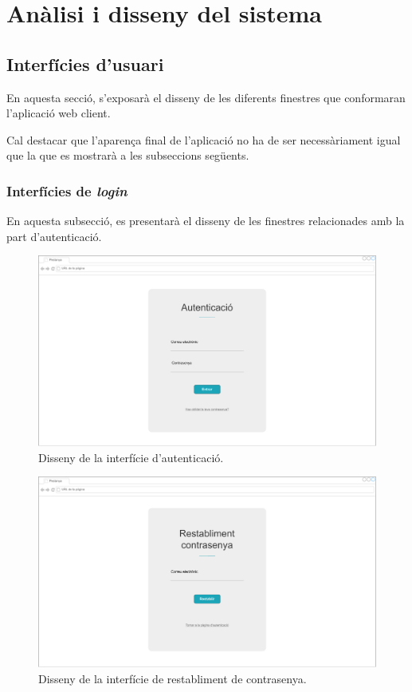 \documentclass[a4paper,12pt]{ThesisStyle}
\begin{document}
\chapter{Anàlisi i disseny del sistema}
\label{cap:analisi}

\section{Interfícies d'usuari}
\label{sec:interficies_usuari}

En aquesta secció, s'exposarà el disseny de les diferents finestres que conformaran l'aplicació web client.

Cal destacar que l'aparença final de l'aplicació no ha de ser necessàriament igual que la que es mostrarà a les subseccions següents.

\subsection{Interfícies de \textit{login}}
\label{subsec:interficies_login}

En aquesta subsecció, es presentarà el disseny de les finestres relacionades amb la part d'autenticació.

\begin{figure}[H]
	\centering
	\includegraphics[width=\textwidth]{assets/interfaces/login/login.pdf}
	\caption{\label{img:login}Disseny de la interfície d'autenticació.}
\end{figure}

\begin{figure}[H]
	\centering
	\includegraphics[width=\textwidth]{assets/interfaces/login/passwordRestablishment.pdf}
	\caption{\label{img:passwordRestablishment}Disseny de la interfície de restabliment de contrasenya.}
\end{figure}
\end{document}

